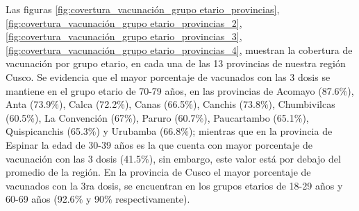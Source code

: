 \documentclass[12pt,a4paper,openany]{book}
\begin{document}
	
	Las figuras \ref{fig:covertura_vacunación_grupo etario_provincias}, \ref{fig:covertura_vacunación_grupo etario_provincias_2}, \ref{fig:covertura_vacunación_grupo etario_provincias_3}, \ref{fig:covertura_vacunación_grupo etario_provincias_4},
	muestran la cobertura de vacunación por grupo etario, en cada una de las 13 provincias de nuestra región Cusco. Se evidencia que el mayor porcentaje de vacunados con las 3 dosis se mantiene en el grupo etario de 70-79 años, en las provincias de Acomayo (87.6$\%$), Anta (73.9$\%$), Calca (72.2$\%$), Canas (66.5$\%$), Canchis (73.8$\%$), Chumbivilcas (60.5$\%$), La Convención (67$\%$), Paruro (60.7$\%$), Paucartambo (65.1$\%$), Quispicanchis (65.3$\%$) y Urubamba (66.8$\%$); mientras que en la provincia de Espinar la edad de 30-39 años es la que cuenta con mayor porcentaje de vacunación con las 3 dosis (41.5$\%$), sin embargo, este valor está por debajo del promedio de la región. En la provincia de Cusco el mayor porcentaje de vacunados con la 3ra dosis, se encuentran en los grupos etarios de 18-29 años y 60-69 años (92.6$\%$ y 90$\%$ respectivamente).
	
\end{document}
